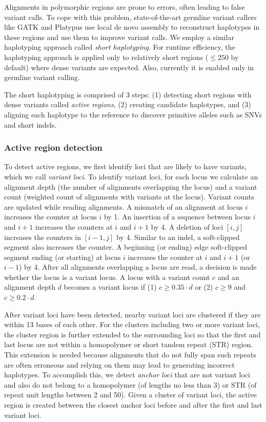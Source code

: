 \documentclass{article}
\begin{document}
Alignments in polymorphic regions are prone to errors, often leading to false variant calls. To cope with this problem, state-of-the-art germline variant callers like GATK and Platypus use local de novo assembly to reconstruct haplotypes in these regions and use them to improve variant calls. We employ a similar haplotyping approach called {\em short haplotyping}. For runtime efficiency, the haplotyping approach is applied only to relatively short regions ($\leq 250$ by default) where dense variants are expected. Also, currently it is enabled only in germline variant calling.

The short haplotyping is comprised of 3 steps: (1) detecting short regions with dense variants called {\em active regions}, (2) creating candidate haplotypes, and (3) aligning each haplotype to the reference to discover primitive alleles such as SNVs and short indels.

\subsubsection{Active region detection}
To detect active regions, we first identify loci that are likely to have variants, which we call {\em variant loci}. To identify variant loci, for each locus we calculate an alignment depth (the number of alignments overlapping the locus) and a variant count (weighted count of alignments with variants at the locus). Variant counts are updated while reading alignments. A mismatch of an alignment at locus $i$ increases the counter at locus $i$ by 1. An insertion of a sequence between locus $i$ and $i+1$ increases the counters at $i$ and $i+1$ by 4. A deletion of loci $[i,j]$ increases the counters in $[i-1,j]$ by 4. Similar to an indel, a soft-clipped segment also increases the counter. A beginning (or ending) edge soft-clipped segment ending (or starting) at locus $i$ increases the counter at $i$ and $i+1$ (or $i-1$) by 4. After all alignments overlapping a locus are read, a decision is made whether the locus is a variant locus. A locus with a variant count $c$ and an alignment depth $d$ becomes a variant locus if (1) $c \geq 0.35 \cdot d$ or (2) $c \geq 9$ and $c \geq 0.2 \cdot d$.

After variant loci have been detected, nearby variant loci are clustered if they are within 13 bases of each other. For the clusters including two or more variant loci, the cluster region is further extended to the surrounding loci so that the first and last locus are not within a homopolymer or short tandem repeat (STR) region. This extension is needed because alignments that do not fully span such repeats are often erroneous and relying on them may lead to generating incorrect haplotypes. To accomplish this, we detect {\em anchor loci} that are not variant loci and also do not belong to a homopolymer (of lengths no less than 3) or STR (of repeat unit lengths between 2 and 50). Given a cluster of variant loci, the active region is created between the closest anchor loci before and after the first and last variant loci.
\end{document}
